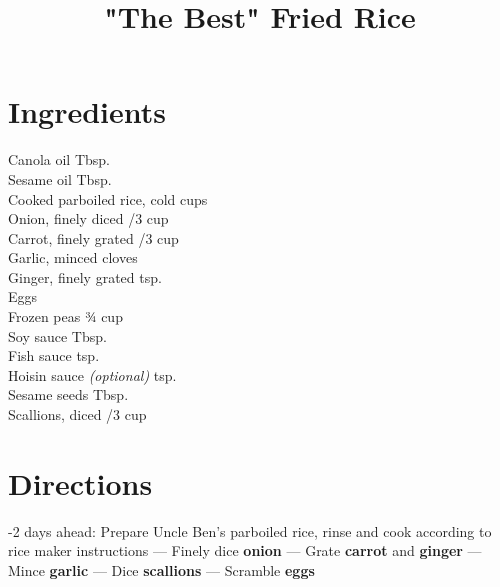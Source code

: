 \documentclass[11pt,letterpaper]{article}
\title{"The Best" Fried Rice}
\author{}
\date{}
\begin{document}
\maketitle
\thispagestyle{empty}

\section*{Ingredients}
\setlength{\columnsep}{20pt}
\begin{multicols}{2}
\noindent
    Canola oil  Tbsp. \\
    Sesame oil  Tbsp. \\
    Cooked parboiled rice,  cold  cups \\
    Onion, finely diced /3 cup \\
    Carrot, finely grated /3 cup \\
    Garlic, minced  cloves \\
    Ginger, finely grated  tsp. \\
    Eggs  \\
    \columnbreak
    Frozen peas \dotfill ¾ cup \\
    Soy sauce  Tbsp. \\
    Fish sauce  tsp. \\
    Hoisin sauce \textit{(optional)}  tsp. \\
    Sesame seeds  Tbsp. \\
    Scallions, diced /3 cup \\
\end{multicols}

\section*{Directions}

-2 days ahead: Prepare Uncle Ben's parboiled rice, rinse and cook according to rice maker instructions ---
Finely dice \textbf{onion} ---
Grate \textbf{carrot} and \textbf{ginger} ---
Mince \textbf{garlic} ---
Dice \textbf{scallions} ---
Scramble \textbf{eggs}
\end{document}
